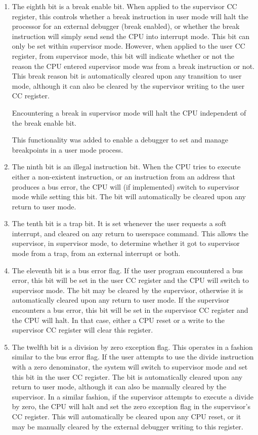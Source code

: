 \documentclass{gqtekspec}
\begin{document}
\begin{enumerate}
\item The eighth bit is a break enable bit.  When applied to the supervisor CC
	register, this controls whether a break instruction in user mode will
	halt the processor for an external debugger (break enabled), or
	whether the break instruction will simply send send the CPU into
	interrupt mode.  This bit can only be set within supervisor mode. 
	However, when applied to the user CC register, from supervisor mode,
	this bit will indicate whether or not the reason the CPU entered
	supervisor mode was from a break instruction or not.  This break
	reason bit is automatically cleared upon any transition to user mode,
	although it can also be cleared by the supervisor writing to the
	user CC register.

	Encountering a break in supervisor mode will halt the CPU independent
	of the break enable bit. 

	This functionality was added to enable a debugger to set and manage
	breakpoints in a user mode process.

\item The ninth bit is an illegal instruction bit.  When the CPU tries to
	execute either a non-existent instruction, or an instruction from
	an address that produces a bus error, the CPU will (if implemented)
	switch to supervisor mode while setting this bit.  The bit will
	automatically be cleared upon any return to user mode.

\item The tenth bit is a trap bit.  It is set whenever the user requests a
	soft interrupt, and cleared on any return to userspace command.  This
	allows the supervisor, in supervisor mode, to determine whether it got
	to supervisor mode from a trap, from an external interrupt or both.

\item The eleventh bit is a bus error flag.  If the user program encountered
	a bus error, this bit will be set in the user CC register and the CPU
	will switch to supervisor mode.  The bit may be cleared by the
	supervisor, otherwise it is automatically cleared upon any return to
	user mode.  If the supervisor encounters a bus error, this bit will be
	set in the supervisor CC register and the CPU will halt.  In that
	case, either a CPU reset or a write to the supervisor CC register will
	clear this register.

\item The twelfth bit is a division by zero exception flag.  This operates
	in a fashion similar to the bus error flag.  If the user attempts
	to use the divide instruction with a zero denominator, the system
	will switch to supervisor mode and set this bit in the user CC
	register.  The bit is automatically cleared upon any return to user
	mode, although it can also be manually cleared by the supervisor.  In
	a similar fashion, if the supervisor attempts to execute a divide by
	zero, the CPU will halt and set the zero exception flag in the
	supervisor's CC register.  This will automatically be cleared upon any
	CPU reset, or it may be manually cleared by the external debugger
	writing to this register.


\end{enumerate}
\end{document}
